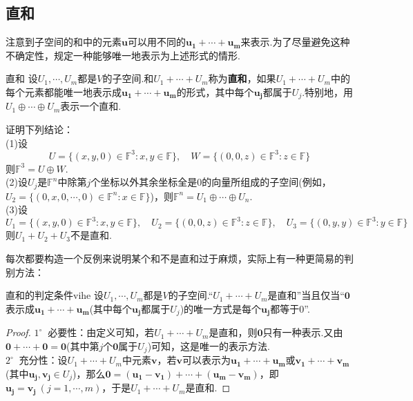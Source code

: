 \documentclass[lang=cn, zihao=5]{elegantbook}
\newcommand{\F}{\mathbb{F}}
\newcommand{\buzhou}[1]{$#1^{\circ} \ $}
\begin{document}
\subsection{直和}

注意到子空间的和中的元素$\boldsymbol{u}$可以用不同的$\boldsymbol{u_1}+ \cdots + \boldsymbol{u_m}$来表示.为了尽量避免这种不确定性，规定一种能够唯一地表示为上述形式的情形.

\begin{definition}{直和}
    设$U_1,\cdots ,U_m$都是$V$的子空间.和$U_1 + \cdots + U_m$称为\textbf{直和}，如果$U_1+ \cdots +U_m$中的每个元素都能唯一地表示成$\boldsymbol{u_1}+ \cdots + \boldsymbol{u_m}$的形式，其中每个$\boldsymbol{u_j}$都属于$U_j$.特别地，用$U_1 \oplus \cdots \oplus U_m$表示一个直和.
\end{definition}

\begin{example}
    证明下列结论： \\
    (1)设$$U = \{ (x,y,0) \in \F ^{3} : x,y \in \F \}, \quad W = \{ (0,0,z) \in \F ^{3} : z \in \F \}$$
    则$\F ^{3} = U \oplus W$. \\
    (2)设$U_j$是$\F ^{n}$中除第$j$个坐标以外其余坐标全是$0$的向量所组成的子空间(例如，$U_2= \{ (0,x,0,\cdots ,0) \in \F ^{n} : x \in \F \}$)，则$\F ^{n} = U_1 \oplus \cdots \oplus U_n$. \\
    (3)设$$U_1 = \{ (x,y,0) \in \F ^{3} : x,y \in \F \}, \quad U_2 = \{ (0,0,z) \in \F ^{3} : z \in \F \}, \quad U_3 = \{ (0,y,y) \in \F ^{3} : y \in \F \}$$
    则$U_1+U_2+U_3$不是直和.
\end{example}

每次都要构造一个反例来说明某个和不是直和过于麻烦，实际上有一种更简易的判别方法：

\begin{proposition}{直和的判定条件}{vihe}
    设$U_1,\cdots ,U_m$都是$V$的子空间.“$U_1 + \cdots + U_m$是直和”当且仅当“$\boldsymbol{0}$表示成$\boldsymbol{u_1}+\cdots +\boldsymbol{u_m}$(其中每个$\boldsymbol{u_j}$都属于$U_j$)的唯一方式是每个$\boldsymbol{u_j}$都等于$0$”.
\end{proposition}
\begin{proof}
    \buzhou{1} 必要性：由定义可知，若$U_1 + \cdots + U_m$是直和，则$\boldsymbol{0}$只有一种表示.又由$\boldsymbol{0} + \cdots + \boldsymbol{0} = \boldsymbol{0}$(其中第$j$个$\boldsymbol{0}$属于$U_j$)可知，这是唯一的表示方法. \\
    \buzhou{2} 充分性：设$U_1 + \cdots + U_m$中元素$\boldsymbol{v}$，若$\boldsymbol{v}$可以表示为$\boldsymbol{u_1} + \cdots + \boldsymbol{u_m}$或$\boldsymbol{v_1} + \cdots + \boldsymbol{v_m}$(其中$\boldsymbol{u_j},\boldsymbol{v_j} \in U_j$)，那么$\boldsymbol{0} = (\boldsymbol{u_1} - \boldsymbol{v_1}) + \cdots + (\boldsymbol{u_m} - \boldsymbol{v_m})$，即$\boldsymbol{u_j}=\boldsymbol{v_j} ~(j=1,\cdots ,m)$，于是$U_1 + \cdots + U_m$是直和.
\end{proof}
\end{document}
